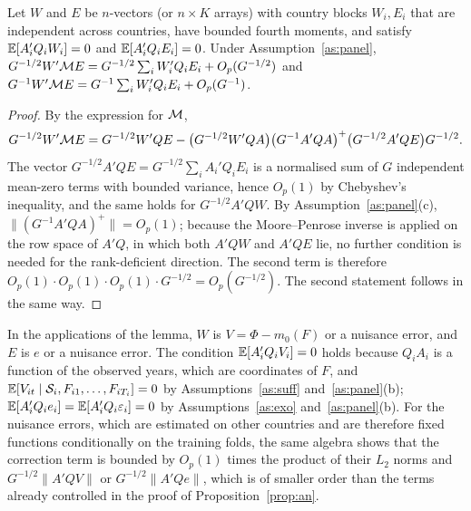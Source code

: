 \documentclass[preprint,12pt,authoryear]{elsarticle}
\begin{document}
\begin{lemma}\label{lem:year}
Let $W$ and $E$ be $n$-vectors (or $n\times K$ arrays) with country blocks $W_i,E_i$ that are independent across countries, have bounded fourth moments, and satisfy $\mathbb{E}[A_i'Q_iW_i]=0$ and $\mathbb{E}[A_i'Q_iE_i]=0$. Under Assumption~\ref{as:panel}, $G^{-1/2}W'\mathcal{M} E=G^{-1/2}\sum_iW_i'Q_iE_i+O_p(G^{-1/2})$ and $G^{-1}W'\mathcal{M} E=G^{-1}\sum_iW_i'Q_iE_i+O_p(G^{-1})$.
\end{lemma}

\begin{proof}
By the expression for $\mathcal{M}$,
\[
G^{-1/2}W'\mathcal{M} E=G^{-1/2}W'QE-\big(G^{-1/2}W'QA\big)\big(G^{-1}A'QA\big)^{+}\big(G^{-1/2}A'QE\big)G^{-1/2}.
\] The vector $G^{-1/2}A'QE=G^{-1/2}\sum_iA_i'Q_iE_i$ is a normalised sum of $G$ independent mean-zero terms with bounded variance, hence $O_p(1)$ by Chebyshev's inequality, and the same holds for $G^{-1/2}A'QW$. By Assumption~\ref{as:panel}(c), $\|(G^{-1}A'QA)^{+}\|=O_p(1)$; because the Moore--Penrose inverse is applied on the row space of $A'Q$, in which both $A'QW$ and $A'QE$ lie, no further condition is needed for the rank-deficient direction. The second term is therefore $O_p(1)\cdot O_p(1)\cdot O_p(1)\cdot G^{-1/2}=O_p(G^{-1/2})$. The second statement follows in the same way.
\end{proof}

In the applications of the lemma, $W$ is $V=\Phi-m_0(F)$ or a nuisance error, and $E$ is $e$ or a nuisance error. The condition $\mathbb{E}[A_i'Q_iV_i]=0$ holds because $Q_iA_i$ is a function of the observed years, which are coordinates of $F$, and $\mathbb{E}[V_{it}\mid\mathcal S_i,F_{i1},\dots,F_{iT_i}]=0$ by Assumptions~\ref{as:suff} and~\ref{as:panel}(b); $\mathbb{E}[A_i'Q_ie_i]=\mathbb{E}[A_i'Q_i\varepsilon_i]=0$ by Assumptions~\ref{as:exo} and~\ref{as:panel}(b). For the nuisance errors, which are estimated on other countries and are therefore fixed functions conditionally on the training folds, the same algebra shows that the correction term is bounded by $O_p(1)$ times the product of their $L_2$ norms and $G^{-1/2}\|A'QV\|$ or $G^{-1/2}\|A'Qe\|$, which is of smaller order than the terms already controlled in the proof of Proposition~\ref{prop:an}.
\end{document}
